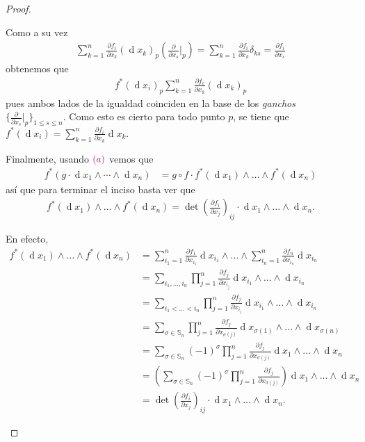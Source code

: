 \documentclass[11pt]{article}
\newcommand{\Ss}{\mathbb{S}}
\renewcommand{\d}{\operatorname{d}}
\newcommand{\paint}[1]{\color{color}{#1}}
\begin{document}
\begin{proof}
\begin{itemize}[listparindent = \parindent]
Como a su vez 
\begin{align*}
\sum_{k=1}^n\frac{\partial f_i}{\partial x_k}(\d {x_k})_p\left(\frac{\partial}{\partial x_s}\Big|_{p}\right) = \sum_{k=1}^n\frac{\partial f_i}{\partial x_k}\delta_{ks} = \frac{\partial f_i}{\partial x_s}
\end{align*}
obtenemos que 
\begin{align*}
f^*(\d x_i)_p \sum_{k=1}^n\frac{\partial f_i}{\partial x_k}(\d {x_k})_{p}
\end{align*}
pues ambos lados de la igualdad coinciden en la base de los \textit{ganchos} $\{\frac{\partial}{\partial x_s}|_p\}_{1 \leq s \leq n}$. Como esto es cierto para todo punto $p$, se tiene que $f^*(\d x_i) = \sum_{k=1}^n\frac{\partial f_i}{\partial x_k}\d {x_k}$.

Finalmente, usando $\paint{(a)}$ vemos que
\begin{align*}
f^*(g\cdot\d x_1\wedge\cdots\wedge\d x_n) &= g \circ f \cdot f^*(\d x_1)\wedge\dots\wedge f^*(\d x_n)
\end{align*}
así que para terminar el inciso basta ver que
\begin{align*}
f^*(\d x_1)\wedge\dots\wedge f^*(\d x_n) = \det(\frac{\partial f_i}{\partial x_j})_{ij} \cdot  \d x_1 \wedge\dots\wedge\d x_n.
\end{align*}

En efecto,
\begin{align*}
f^*(\d x_1)\wedge\dots\wedge f^*(\d x_n) &= \sum_{i_1=1}^n\frac{\partial f_1}{\partial x_{i_1}}\d {x_{i_1}} \wedge \dots \wedge \sum_{i_n=1}^n\frac{\partial f_n}{\partial x_{i_n}}\d {x_{i_n}}\\
&= \sum_{i_1, \dots, i_n}\prod_{j=1}^n\frac{\partial f_j}{\partial x_{i_j}} \d x_{i_1} \wedge\dots\wedge \d x_{i_n}\\
&= \sum_{i_1 < \dots < i_n} \prod_{j=1}^n\frac{\partial f_j}{\partial x_{i_j}} \d x_{i_1} \wedge\dots\wedge \d x_{i_n}\\
&= \sum_{\sigma \in \Ss_n} \prod_{j=1}^n\frac{\partial f_j}{\partial x_{\sigma(j)}} \d x_{\sigma(1)} \wedge\dots\wedge \d x_{\sigma(n)}\\
&= \sum_{\sigma \in \Ss_n} (-1)^\sigma \prod_{j=1}^n\frac{\partial f_j}{\partial x_{\sigma(j)}} \d x_1 \wedge\dots\wedge \d x_n\\
&= \left(\sum_{\sigma \in \Ss_n} (-1)^\sigma \prod_{j=1}^n\frac{\partial f_j}{\partial x_{\sigma(j)}}\right) \d x_1 \wedge\dots\wedge \d x_n\\
&= \det\left(\frac{\partial f_i}{\partial x_j}\right)_{ij} \cdot  \d x_1 \wedge\dots\wedge\d x_n.
\end{align*}
\end{itemize}
\end{proof}
\end{document}
